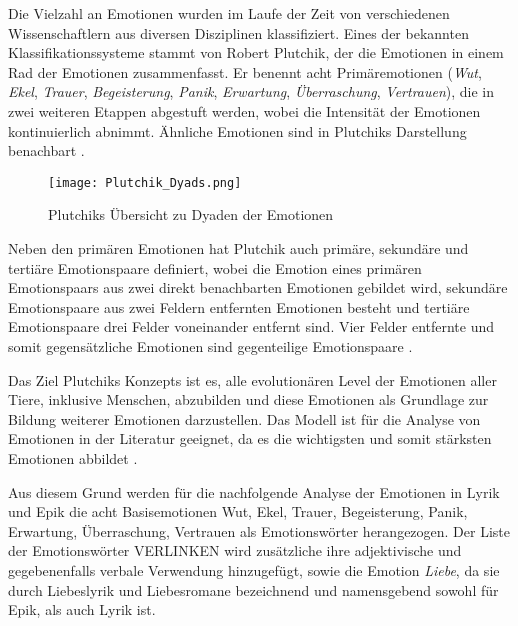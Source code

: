 \documentclass[a4paper,10p]{article}
\begin{document}
Die Vielzahl an Emotionen wurden im Laufe der Zeit von verschiedenen Wissenschaftlern aus diversen Disziplinen klassifiziert. Eines der bekannten Klassifikationssysteme stammt von Robert Plutchik, der die Emotionen in einem Rad der Emotionen zusammenfasst. Er benennt acht Primäremotionen (\textit{Wut}, \textit{Ekel}, \textit{Trauer}, \textit{Begeisterung}, \textit{Panik}, \textit{Erwartung}, \textit{Überraschung}, \textit{Vertrauen}), die in zwei weiteren Etappen abgestuft werden, wobei die Intensität der Emotionen kontinuierlich abnimmt. Ähnliche Emotionen sind in Plutchiks Darstellung benachbart \citep[vgl.][S. 40-122]{Plutchik}. 

\begin{wrapfigure}{r}{0.5\textwidth}
	\texttt{[image: Plutchik\_Dyads.png]}
	\caption{Plutchiks Übersicht zu Dyaden der Emotionen}
	\label{fig:Dyads}
\end{wrapfigure}

Neben den primären Emotionen hat Plutchik auch primäre, sekundäre und tertiäre Emotionspaare definiert, wobei die Emotion eines primären Emotionspaars aus zwei direkt benachbarten Emotionen gebildet wird, sekundäre Emotionspaare aus zwei Feldern entfernten Emotionen besteht und tertiäre Emotionspaare drei Felder voneinander entfernt sind. Vier Felder entfernte und somit gegensätzliche Emotionen sind gegenteilige Emotionspaare \citep[vgl.][S. 40-122]{Plutchik}.\par 

Das Ziel Plutchiks Konzepts ist es, alle evolutionären Level der Emotionen aller Tiere, inklusive Menschen, abzubilden und diese Emotionen als Grundlage zur Bildung weiterer Emotionen darzustellen. Das Modell ist für die Analyse von Emotionen in der Literatur geeignet, da es die wichtigsten und somit stärksten Emotionen abbildet \citep[vgl.][S. 40-122]{Plutchik}. \par 

Aus diesem Grund werden für die nachfolgende Analyse der Emotionen in Lyrik und Epik die acht Basisemotionen Wut, Ekel, Trauer, Begeisterung, Panik, Erwartung, Überraschung, Vertrauen als Emotionswörter herangezogen. Der Liste der Emotionswörter VERLINKEN wird zusätzliche ihre adjektivische und gegebenenfalls verbale Verwendung hinzugefügt, sowie die Emotion \textit{Liebe}, da sie durch Liebeslyrik und Liebesromane bezeichnend und namensgebend sowohl für Epik, als auch Lyrik ist. 
 
\end{document}
